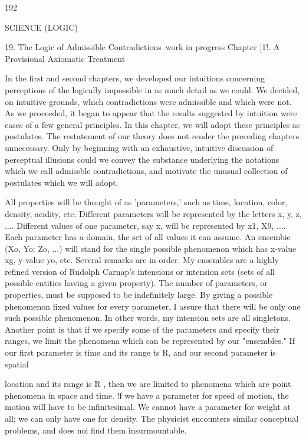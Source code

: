 \documentclass[10pt,twoside]{memoir}
\begin{document}
\begin{enumerate}
{{{{192 


SCIENCE (LOGIC) 


19. The Logic of Admissible Contradictions--work in progress 
Chapter [1!. A Provisional Axiomatic Treatment 


In the first and second chapters, we developed our intuitions 
concerning perceptions of the logically impossible in as much detail as we 
could. We decided, on intuitive grounds, which contradictions were 
admissible and which were not. As we proceeded, it began to appear that the 
results suggested by intuition were cases of a few general principles. In this 
chapter, we will adopt these principles as postulates. The restatement of our 
theory does not render the preceding chapters unnecessary. Only by 
beginning with an exhaustive, intuitive discussion of perceptual illusions 
could we convey the substance underlying the notations which we call 
admissble contradictions, and motivate the unusual collection of postulates 
which we will adopt. 

All properties will be thought of as 'parameters,' such as time, 
location, color, density, acidity, etc. Different parameters will be represented 
by the letters x, y, z, .... Different values of one parameter, say x, will be 
represented by x1, X9, .... Each parameter has a domain, the set of all values 
it can assume. An ensembie (Xo, Yo: Zo, ...) will stand for the single possible 
phenomenon which has x-value xg, y-value yo, etc. Several remarks are in 
order. My ensembles are a highly refined version of Rudolph Carnap's 
intensions or intension sets (sets of all possible entities having a given 
property). The number of parameters, or properties, must be supposed to be 
indefinitely large. By giving a possible phenomenon fixed values for every 
parameter, I assure that there will be only one such possible phenomenon. In 
other words, my intension sets are all singletons. Another point is that if we 
specify some of the parameters and specify their ranges, we limit the 
phenomena which can be represented by our "ensembles." If our first 
parameter is time and its range ts R, and our second parameter is spatial 


location and its range is R , then we are limited to phenomena which are 
point phenomena in space and time. !f we have a parameter for speed of 
motion, the motion will have to be infinitesimal. We cannot have a 
parameter for weight at all; we can only have one for density. The physicist 
encounters similar conceptual problems, and does noi find them 
insurmountable. 

}}}}
\end{enumerate}
\end{document}
